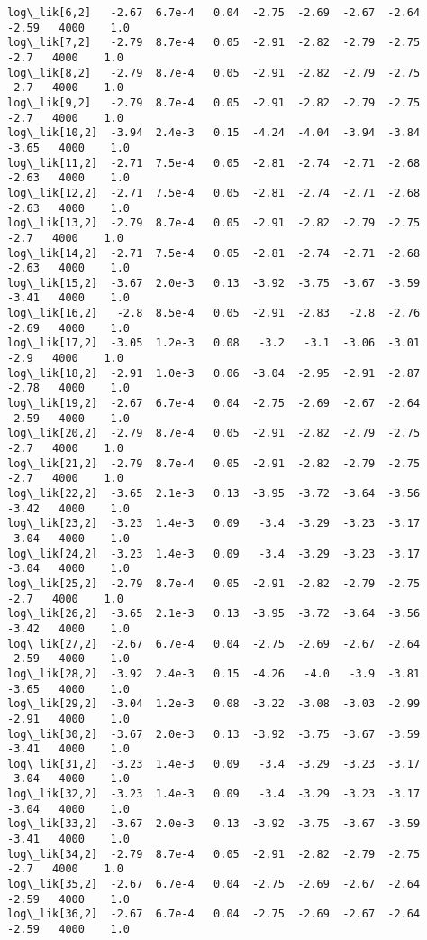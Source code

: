 \documentclass[11pt]{article}
\begin{document}
\begin{Verbatim}[commandchars=\\\{\}]
log\_lik[6,2]   -2.67  6.7e-4   0.04  -2.75  -2.69  -2.67  -2.64  -2.59   4000    1.0
log\_lik[7,2]   -2.79  8.7e-4   0.05  -2.91  -2.82  -2.79  -2.75   -2.7   4000    1.0
log\_lik[8,2]   -2.79  8.7e-4   0.05  -2.91  -2.82  -2.79  -2.75   -2.7   4000    1.0
log\_lik[9,2]   -2.79  8.7e-4   0.05  -2.91  -2.82  -2.79  -2.75   -2.7   4000    1.0
log\_lik[10,2]  -3.94  2.4e-3   0.15  -4.24  -4.04  -3.94  -3.84  -3.65   4000    1.0
log\_lik[11,2]  -2.71  7.5e-4   0.05  -2.81  -2.74  -2.71  -2.68  -2.63   4000    1.0
log\_lik[12,2]  -2.71  7.5e-4   0.05  -2.81  -2.74  -2.71  -2.68  -2.63   4000    1.0
log\_lik[13,2]  -2.79  8.7e-4   0.05  -2.91  -2.82  -2.79  -2.75   -2.7   4000    1.0
log\_lik[14,2]  -2.71  7.5e-4   0.05  -2.81  -2.74  -2.71  -2.68  -2.63   4000    1.0
log\_lik[15,2]  -3.67  2.0e-3   0.13  -3.92  -3.75  -3.67  -3.59  -3.41   4000    1.0
log\_lik[16,2]   -2.8  8.5e-4   0.05  -2.91  -2.83   -2.8  -2.76  -2.69   4000    1.0
log\_lik[17,2]  -3.05  1.2e-3   0.08   -3.2   -3.1  -3.06  -3.01   -2.9   4000    1.0
log\_lik[18,2]  -2.91  1.0e-3   0.06  -3.04  -2.95  -2.91  -2.87  -2.78   4000    1.0
log\_lik[19,2]  -2.67  6.7e-4   0.04  -2.75  -2.69  -2.67  -2.64  -2.59   4000    1.0
log\_lik[20,2]  -2.79  8.7e-4   0.05  -2.91  -2.82  -2.79  -2.75   -2.7   4000    1.0
log\_lik[21,2]  -2.79  8.7e-4   0.05  -2.91  -2.82  -2.79  -2.75   -2.7   4000    1.0
log\_lik[22,2]  -3.65  2.1e-3   0.13  -3.95  -3.72  -3.64  -3.56  -3.42   4000    1.0
log\_lik[23,2]  -3.23  1.4e-3   0.09   -3.4  -3.29  -3.23  -3.17  -3.04   4000    1.0
log\_lik[24,2]  -3.23  1.4e-3   0.09   -3.4  -3.29  -3.23  -3.17  -3.04   4000    1.0
log\_lik[25,2]  -2.79  8.7e-4   0.05  -2.91  -2.82  -2.79  -2.75   -2.7   4000    1.0
log\_lik[26,2]  -3.65  2.1e-3   0.13  -3.95  -3.72  -3.64  -3.56  -3.42   4000    1.0
log\_lik[27,2]  -2.67  6.7e-4   0.04  -2.75  -2.69  -2.67  -2.64  -2.59   4000    1.0
log\_lik[28,2]  -3.92  2.4e-3   0.15  -4.26   -4.0   -3.9  -3.81  -3.65   4000    1.0
log\_lik[29,2]  -3.04  1.2e-3   0.08  -3.22  -3.08  -3.03  -2.99  -2.91   4000    1.0
log\_lik[30,2]  -3.67  2.0e-3   0.13  -3.92  -3.75  -3.67  -3.59  -3.41   4000    1.0
log\_lik[31,2]  -3.23  1.4e-3   0.09   -3.4  -3.29  -3.23  -3.17  -3.04   4000    1.0
log\_lik[32,2]  -3.23  1.4e-3   0.09   -3.4  -3.29  -3.23  -3.17  -3.04   4000    1.0
log\_lik[33,2]  -3.67  2.0e-3   0.13  -3.92  -3.75  -3.67  -3.59  -3.41   4000    1.0
log\_lik[34,2]  -2.79  8.7e-4   0.05  -2.91  -2.82  -2.79  -2.75   -2.7   4000    1.0
log\_lik[35,2]  -2.67  6.7e-4   0.04  -2.75  -2.69  -2.67  -2.64  -2.59   4000    1.0
log\_lik[36,2]  -2.67  6.7e-4   0.04  -2.75  -2.69  -2.67  -2.64  -2.59   4000    1.0

\end{Verbatim}
\end{document}
